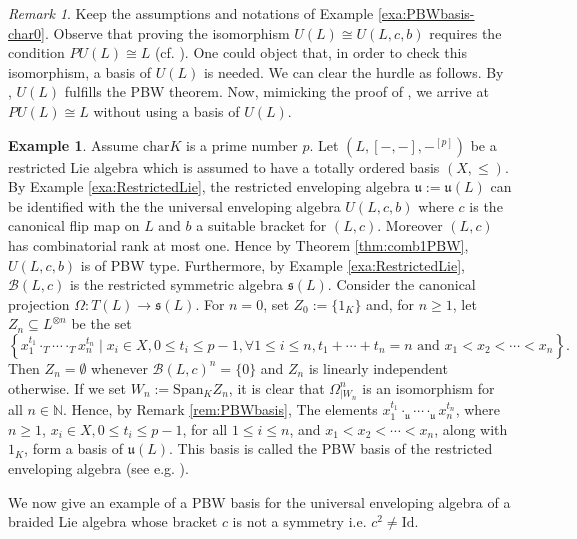 \documentclass[english]{amsart}
\numberwithin{equation}{section}
\numberwithin{figure}{section}
\theoremstyle{plain}
\theoremstyle{definition}
\theoremstyle{definition}
\newtheorem{example}[thm]{Example}
\theoremstyle{remark}
\theoremstyle{remark}
\newtheorem{rem}[thm]{Remark}
\theoremstyle{plain}
\theoremstyle{plain}
\theoremstyle{plain}
\begin{document}
\begin{rem}
Keep the assumptions and notations of Example \ref{exa:PBWbasis-char0}.
Observe that proving the isomorphism $U(L)\cong U(L,c,b)$ requires
the condition $PU(L)\cong L$ (cf. \cite[Example 6.10]{Ardizzoni-MMPrim}).
One could object that, in order to check this isomorphism, a basis
of $U(L)$ is needed. We can clear the hurdle as follows. By \cite[page 92]{Humphreys},
$U(L)$ fulfills the PBW theorem. Now, mimicking the proof of \cite[Corollary 5.5]{Ardizzoni-Universal},
we arrive at $PU(L)\cong L$ without using a basis of $U(L)$.\end{rem}
\begin{example}
\label{exa:PBWbasis-charp}Assume $\mathrm{char}K$ is a prime number
$p$. Let $(L,[-,-],-{}^{[p]})$ be a restricted Lie algebra which
is assumed to have a totally ordered basis $(X,\leq)$. By Example
\ref{exa:RestrictedLie}, the restricted enveloping algebra $\mathfrak{u}:=\mathfrak{u}(L)$
can be identified with the the universal enveloping algebra $U(L,c,b)$
where $c$ is the canonical flip map on $L$ and $b$ a suitable bracket
for $(L,c)$. Moreover $(L,c)$ has combinatorial rank at most one.
Hence by Theorem \ref{thm:comb1PBW}, $U(L,c,b)$ is of PBW type.
Furthermore, by Example \ref{exa:RestrictedLie}, $\mathcal{B}\left(L,c\right)$
is the restricted symmetric algebra $\mathfrak{s}(L)$. Consider the
canonical projection $\Omega:T\left(L\right)\rightarrow\mathfrak{s}(L)$.
For $n=0$, set $Z_{0}:=\{1_{K}\}$ and, for $n\geq1$, let $Z_{n}\subseteq L^{\otimes n}$
be the set \[
\left\{ x_{1}^{t_{1}}\cdot_{T}\cdots\cdot_{T}x_{n}^{t_{n}}\mid x_{i}\in X,0\leq t_{i}\leq p-1,\forall1\leq i\leq n,t_{1}+\cdots+t_{n}=n\text{ and }x_{1}<x_{2}<\cdots<x_{n}\right\} .\]
Then $Z_{n}=\emptyset$ whenever $\mathcal{B}\left(L,c\right)^{n}=\{0\}$
and $Z_{n}$ is linearly independent otherwise. If we set $W_{n}:=\mathrm{Span}{}_{K}Z_{n}$,
it is clear that $\Omega_{\mid W_{n}}^{n}$ is an isomorphism for
all $n\in\mathbb{N}$. Hence, by Remark \ref{rem:PBWbasis}, The elements
$x_{1}^{t_{1}}\cdot_{\mathfrak{u}}\cdots\cdot_{\mathfrak{u}}x_{n}^{t_{n}}$,
where $n\geq1$, $x_{i}\in X,0\leq t_{i}\leq p-1$, for all $1\leq i\leq n$,
and $x_{1}<x_{2}<\cdots<x_{n}$, along with $1_K$, form a basis of
$\mathfrak{u}(L)$. This basis is called the PBW basis of the restricted
enveloping algebra (see e.g. \cite[page 23]{Montgomery}). 
\end{example}
We now give an example of a PBW basis for the universal enveloping
algebra of a braided Lie algebra whose bracket $c$ is not a symmetry
i.e. $c^{2}\neq\mathrm{Id}$.
\end{document}
